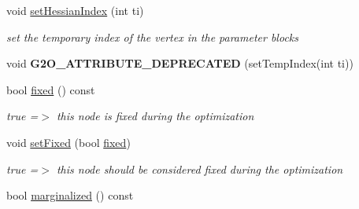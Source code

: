 \begin{DoxyCompactItemize}
\item 
\hypertarget{classg2o_1_1OptimizableGraph_1_1Vertex_a440f24c0108be5247f3529369aa1e53c}{void \hyperlink{classg2o_1_1OptimizableGraph_1_1Vertex_a440f24c0108be5247f3529369aa1e53c}{set\-Hessian\-Index} (int ti)}\label{classg2o_1_1OptimizableGraph_1_1Vertex_a440f24c0108be5247f3529369aa1e53c}

\begin{DoxyCompactList}\small\item\em set the temporary index of the vertex in the parameter blocks \end{DoxyCompactList}\item 
\hypertarget{classg2o_1_1OptimizableGraph_1_1Vertex_abdcd545b6870b37135b055d18dae7a36}{void {\bfseries G2\-O\-\_\-\-A\-T\-T\-R\-I\-B\-U\-T\-E\-\_\-\-D\-E\-P\-R\-E\-C\-A\-T\-E\-D} (set\-Temp\-Index(int ti))}\label{classg2o_1_1OptimizableGraph_1_1Vertex_abdcd545b6870b37135b055d18dae7a36}

\item 
\hypertarget{classg2o_1_1OptimizableGraph_1_1Vertex_ac83c34e6176f0cc5315ad7401a49efb3}{bool \hyperlink{classg2o_1_1OptimizableGraph_1_1Vertex_ac83c34e6176f0cc5315ad7401a49efb3}{fixed} () const }\label{classg2o_1_1OptimizableGraph_1_1Vertex_ac83c34e6176f0cc5315ad7401a49efb3}

\begin{DoxyCompactList}\small\item\em true =$>$ this node is fixed during the optimization \end{DoxyCompactList}\item 
\hypertarget{classg2o_1_1OptimizableGraph_1_1Vertex_af92ef49e1bcd6a8166afa151d367b905}{void \hyperlink{classg2o_1_1OptimizableGraph_1_1Vertex_af92ef49e1bcd6a8166afa151d367b905}{set\-Fixed} (bool \hyperlink{classg2o_1_1OptimizableGraph_1_1Vertex_ac83c34e6176f0cc5315ad7401a49efb3}{fixed})}\label{classg2o_1_1OptimizableGraph_1_1Vertex_af92ef49e1bcd6a8166afa151d367b905}

\begin{DoxyCompactList}\small\item\em true =$>$ this node should be considered fixed during the optimization \end{DoxyCompactList}\item 
\hypertarget{classg2o_1_1OptimizableGraph_1_1Vertex_a214c01f0b3cab575f3496be729f6ccb1}{bool \hyperlink{classg2o_1_1OptimizableGraph_1_1Vertex_a214c01f0b3cab575f3496be729f6ccb1}{marginalized} () const }\label{classg2o_1_1OptimizableGraph_1_1Vertex_a214c01f0b3cab575f3496be729f6ccb1}


\end{DoxyCompactItemize}
